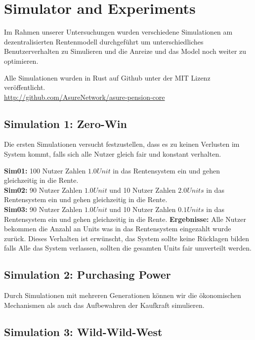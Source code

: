 \section{Simulator and Experiments}

Im Rahmen unserer Untersuchungen wurden verschiedene Simulationen am dezentralisierten Rentenmodell durchgeführt um unterschiedliches Benutzerverhalten zu Simulieren und die Anreize und das Model noch weiter zu optimieren.

Alle Simulationen wurden in Rust auf Github unter der MIT Lizenz veröffentlicht.\\
\url{http://github.com/AsureNetwork/asure-pension-core}

\subsection{Simulation 1: Zero-Win}

Die ersten Simulationen versucht festzustellen, dass es zu keinen Verlusten im System kommt, falls sich alle Nutzer gleich fair und konstant verhalten.

\textbf{Sim01:} 100 Nutzer Zahlen $1.0 Unit$ in das Rentensystem ein und gehen gleichzeitig in die Rente.\\
\textbf{Sim02:} 90 Nutzer Zahlen $1.0 Unit$ und 10 Nutzer Zahlen $2.0 Units$ in das Rentensystem ein und gehen gleichzeitig in die Rente.\\
\textbf{Sim03:} 90 Nutzer Zahlen $1.0 Unit$ und 10 Nutzer Zahlen $0.1 Units$ in das Rentensystem ein und gehen gleichzeitig in die Rente.
\newline \newline 
\textbf{Ergebnisse:} Alle Nutzer bekommen die Anzahl an Units was in das Rentensystem eingezahlt wurde zurück. Dieses Verhalten ist erwünscht, das System sollte keine Rücklagen bilden falls Alle das System verlassen, sollten die gesamten Units fair umverteilt werden.

\begin{table}[h!]
\centering
{}
\end{table}


\subsection{Simulation 2: Purchasing Power}

Durch Simulationen mit mehreren Generationen können wir die ökonomischen Mechanismen als auch das Aufbewahren der Kaufkraft simulieren.



\subsection{Simulation 3: Wild-Wild-West}